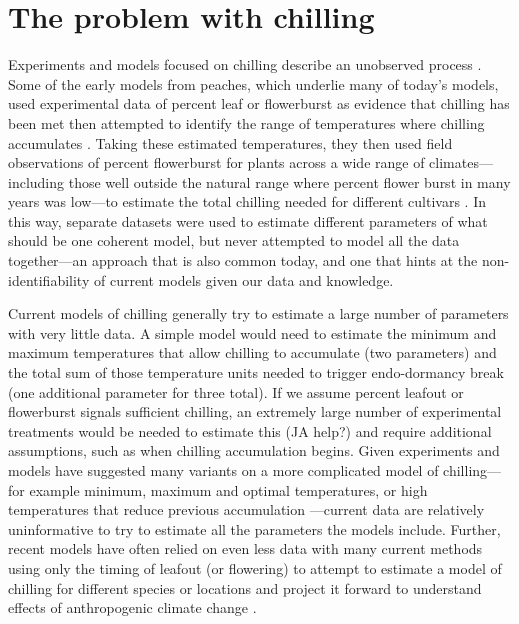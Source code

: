 \documentclass[11pt]{article}
\begin{document}
\section*{The problem with chilling} 

Experiments and models focused on chilling describe an unobserved process \citep{chuine2016,chuinearees}. Some of the early models from peaches, which underlie many of today's models, used experimental data of percent leaf or flowerburst as evidence that chilling has been met then attempted to identify the range of temperatures where chilling accumulates \citep{erez1971}. Taking these estimated temperatures, they then used field observations of percent flowerburst for plants across a wide range of climates---including those well outside the natural range where percent flower burst in many years was low---to estimate the total chilling needed for different cultivars \citep{richardson1974}. In this way, separate datasets were used to estimate different parameters of what should be one coherent model, but never attempted to model all the data together---an approach that is also common today, and one that hints at the non-identifiability of current models given our data and knowledge. 


Current models of chilling generally try to estimate a large number of parameters with very little data. A simple model would need to estimate the minimum and maximum temperatures that allow chilling to accumulate (two parameters) and the total sum of those temperature units needed to trigger endo-dormancy break (one additional parameter for three total). If we assume percent leafout or flowerburst signals sufficient chilling, an extremely large number of experimental treatments would be needed to estimate this (JA help?) and require additional assumptions, such as when chilling accumulation begins. Given experiments and models have suggested many variants on a more complicated model of chilling---for example minimum, maximum and optimal temperatures, or high temperatures that reduce previous accumulation \citep[Fig. \ref{fig:modelsketch}][]{lued2011,luedeling2012chilling,chuine2016}---current data are relatively uninformative to try to estimate all the parameters the models include. Further, recent models have often relied on even less data with many current methods using only the timing of leafout (or flowering) to attempt to estimate a model of chilling for different species or locations and project it forward to understand effects of anthropogenic climate change \citep{lued2011,luedeling2012chilling,gao2024}. %
\end{document}
